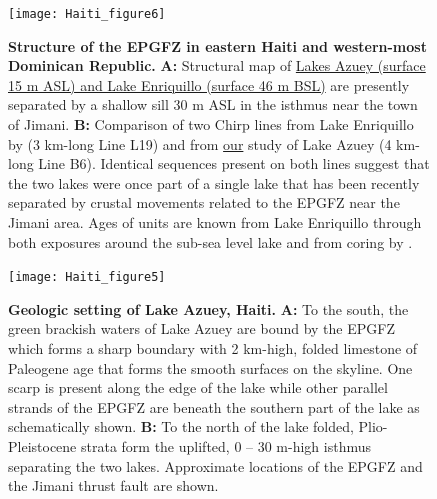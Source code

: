 \documentclass[linenumbers,draft]{agujournal}
\begin{document}
\begin{figure}
\centering
\texttt{[image: Haiti\_figure6]}
\caption{\textbf{Structure of the EPGFZ in eastern Haiti and western-most Dominican Republic.} \textbf{A:} Structural map of \ul{Lakes Azuey (surface 15 m ASL) and Lake Enriquillo (surface 46 m BSL)} are presently separated by a shallow sill 30 m ASL in the isthmus near the town of Jimani. \textbf{B:} Comparison of two Chirp lines from Lake Enriquillo by \citet{rios2013holocene} (3 km-long Line L19) and from \ul{our} study of Lake Azuey (4 km-long Line B6). Identical sequences present on both lines suggest that the two lakes were once part of a single lake that has been recently separated by crustal movements related to the EPGFZ near the Jimani area. Ages of units are known from Lake Enriquillo through both exposures around the sub-sea level lake and from coring by \citet{rios2013holocene}.}
\label{figure4}
\end{figure}

\begin{figure}
\centering
\texttt{[image: Haiti\_figure5]}
\caption{\textbf{Geologic setting of Lake Azuey, Haiti.} \textbf{A:} To the south, the green brackish waters of Lake Azuey are bound by the EPGFZ which forms a sharp boundary with 2 km-high, folded limestone of Paleogene age that forms the smooth surfaces on the skyline. One scarp is present along the edge of the lake while other parallel strands of the EPGFZ are beneath the southern part of the lake as schematically shown. \textbf{B:} To the north of the lake folded, Plio-Pleistocene strata form the uplifted, 0 -- 30 m-high isthmus separating the two lakes. Approximate locations of the EPGFZ and the Jimani thrust fault are shown.}
\label{figure5}
\end{figure}
\end{document}
